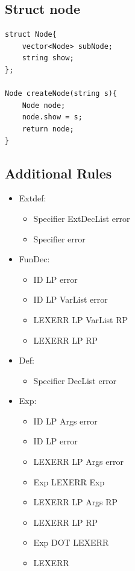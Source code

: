 \documentclass{article}
\begin{document}
        \subsection{Struct node}
            \begin{lstlisting}
struct Node{
    vector<Node> subNode;
    string show;
};

Node createNode(string s){
    Node node;
    node.show = s;
    return node;
}                       
            \end{lstlisting}
        \subsection{Additional Rules}
            \begin{itemize}
                \item Extdef: 
                \begin{itemize}
                    \item Specifier ExtDecList error 
                    \item Specifier error
                \end{itemize}
                \item FunDec:
                \begin{itemize}
                    \item ID LP error
                    \item ID LP VarList error
                    \item LEXERR LP VarList RP
                    \item LEXERR LP RP
                \end{itemize}
                \item Def:
                \begin{itemize}
                    \item Specifier DecList error
                \end{itemize}
                \item Exp:
                \begin{itemize}
                    \item ID LP Args error
                    \item ID LP error
                    \item LEXERR LP Args error
                    \item Exp LEXERR Exp
                    \item LEXERR LP Args RP
                    \item LEXERR LP RP
                    \item Exp DOT LEXERR 
                    \item LEXERR
                \end{itemize}
            \end{itemize}
\end{document}

